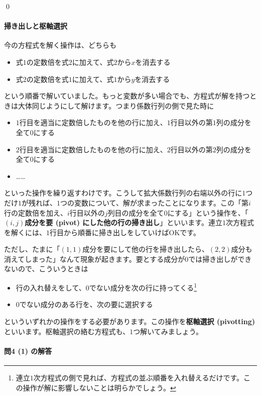 \qed

\paragraph{掃き出しと枢軸選択} 今の方程式を解く操作は、どちらも
\begin{itemize}
\item 式$1$の定数倍を式$2$に加えて、式$2$から$x$を消去する
\item 式$2$の定数倍を式$1$に加えて、式$1$から$y$を消去する
\end{itemize}
という順番で解いていました。もっと変数が多い場合でも、方程式が解を持つときは大体同じようにして解けます。つまり係数行列の側で見た時に
\begin{itemize}
\item $1$行目を適当に定数倍したものを他の行に加え、$1$行目以外の第$1$列の成分を全て$0$にする
\item $2$行目を適当に定数倍したものを他の行に加え、$2$行目以外の第$2$列の成分を全て$0$にする
\item ……
\end{itemize}
といった操作を繰り返すわけです。こうして拡大係数行列の右端以外の行に$1$つだけ$1$が残れば、$1$つの変数について、解が求まったことになります。この「第$i$行の定数倍を加え、$i$行目以外の$j$列目の成分を全て$0$にする」という操作を、「\textbf{$(i, j)$成分を要 (pivot) にした他の行の掃き出し}」といいます。連立$1$次方程式を解くには、$1$行目から順番に掃き出しをしていけばOKです。

ただし、たまに「$(1, 1)$成分を要にして他の行を掃き出したら、$(2, 2)$成分も消えてしまった」なんて現象が起きます。要とする成分が$0$では掃き出しができないので、こういうときは
\begin{itemize}
\item 行の入れ替えをして、$0$でない成分を次の行に持ってくる\footnote{連立$1$次方程式の側で見れば、方程式の並ぶ順番を入れ替えるだけです。この操作が解に影響しないことは明らかでしょう。}
\item $0$でない成分のある行を、次の要に選択する
\end{itemize}
といういずれかの操作をする必要があります。この操作を\textbf{枢軸選択 (pivotting)}といいます。枢軸選択の絡む方程式も、$1$つ解いてみましょう。

\paragraph{問4 (1) の解答}

